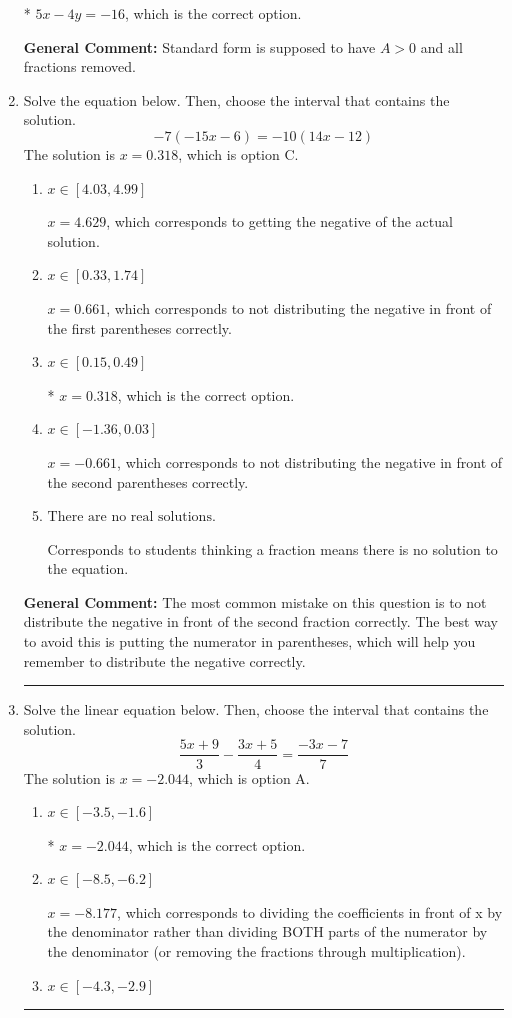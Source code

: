 \documentclass{extbook}[14pt]
\newcommand{\litem}[1]{\item #1

\rule{\textwidth}{0.4pt}}
\begin{document}
\begin{enumerate}
{\begin{enumerate}[label=\Alph*.]
* $5x - 4y = -16$, which is the correct option.
\end{enumerate}

\textbf{General Comment:} Standard form is supposed to have $A > 0$ and all fractions removed.
}
\litem{
Solve the equation below. Then, choose the interval that contains the solution.
\[ -7(-15x -6) = -10(14x -12) \]The solution is \( x = 0.318 \), which is option C.\begin{enumerate}[label=\Alph*.]
\item \( x \in [4.03, 4.99] \)

$x = 4.629$, which corresponds to getting the negative of the actual solution.
\item \( x \in [0.33, 1.74] \)

$x = 0.661$, which corresponds to not distributing the negative in front of the first parentheses correctly.
\item \( x \in [0.15, 0.49] \)

* $x = 0.318$, which is the correct option.
\item \( x \in [-1.36, 0.03] \)

$x = -0.661$, which corresponds to not distributing the negative in front of the second parentheses correctly.
\item \( \text{There are no real solutions.} \)

Corresponds to students thinking a fraction means there is no solution to the equation.
\end{enumerate}

\textbf{General Comment:} The most common mistake on this question is to not distribute the negative in front of the second fraction correctly. The best way to avoid this is putting the numerator in parentheses, which will help you remember to distribute the negative correctly.
}
\litem{
Solve the linear equation below. Then, choose the interval that contains the solution.
\[ \frac{5x + 9}{3} - \frac{3x + 5}{4} = \frac{-3x -7}{7} \]The solution is \( x = -2.044 \), which is option A.\begin{enumerate}[label=\Alph*.]
\item \( x \in [-3.5, -1.6] \)

* $x = -2.044$, which is the correct option.
\item \( x \in [-8.5, -6.2] \)

 $x = -8.177$, which corresponds to dividing the coefficients in front of x by the denominator rather than dividing BOTH parts of the numerator by the denominator (or removing the fractions through multiplication).
\item \( x \in [-4.3, -2.9] \)


\end{enumerate}}
\end{enumerate}
\end{document}
